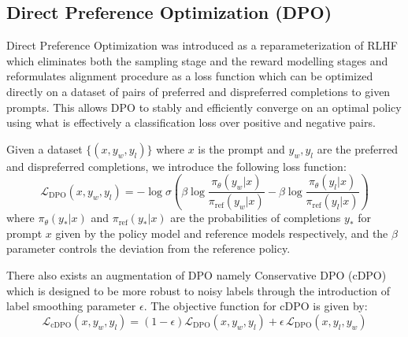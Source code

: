 \subsection{Direct Preference Optimization (DPO)}
Direct Preference Optimization was introduced as a reparameterization of RLHF which eliminates both the sampling stage and the reward modelling stages and reformulates alignment procedure as a loss function which can be optimized directly on a dataset of pairs of preferred and dispreferred completions to given prompts. This allows DPO to stably and efficiently converge on an optimal policy using what is effectively a classification loss over positive and negative pairs.

Given a dataset $\{(x,y_w,y_l)\}$ where $x$ is the prompt and $y_w,y_l$ are the preferred and dispreferred completions, we introduce the following loss function:
\begin{equation}
    \mathcal{L}_\text{DPO}(x,y_w,y_l)=
    -\log\sigma
    \left(
        \beta\log \frac{\pi_\theta(y_w|x)}{\pi_\text{ref}(y_w|x)} -
        \beta\log \frac{\pi_\theta(y_l|x)}{\pi_\text{ref}(y_l|x)}
    \right)
    \label{eq:dpo}
\end{equation}
where $\pi_\theta(y_*|x)$ and $\pi_\text{ref}(y_*|x)$ are the probabilities of completions $y_*$ for prompt $x$ given by the policy model and reference models respectively, and the $\beta$ parameter controls the deviation from the reference policy.

There also exists an augmentation of DPO namely Conservative DPO (cDPO) \cite{cdpo} which is designed to be more robust to noisy labels through the introduction of label smoothing parameter $\epsilon$. The objective function for cDPO is given by:%
\begin{equation}
    \mathcal{L}_\text{cDPO}(x,y_w,y_l)=
    (1-\epsilon) \mathcal{L}_\text{DPO}(x,y_w,y_l) +
    \epsilon\,\mathcal{L}_\text{DPO}(x,y_l,y_w)
    \label{eq:cdpo}
\end{equation}